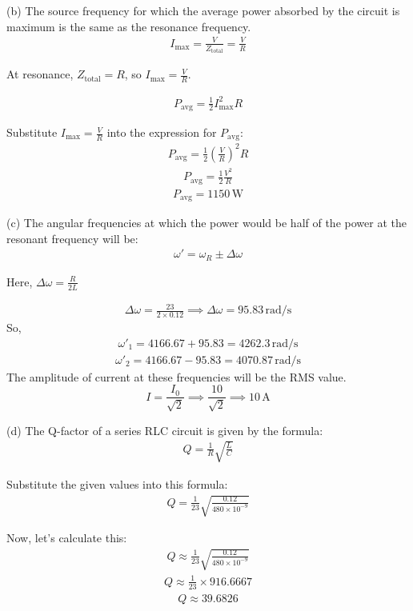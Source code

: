 \documentclass[journal,12pt,twocolumn]{IEEEtran}
\theoremstyle{remark}
\begin{document}
(b) The source frequency for which the average power absorbed by the circuit is maximum is the same as the resonance frequency. 
\begin{align}
    I_{\text{max}} = \frac{V}{Z_{\text{total}}} = \frac{V}{R}
\end{align}

At resonance, \(Z_{\text{total}} = R\), so \(I_{\text{max}} = \frac{V}{R}\).

\begin{align}
    P_{\text{avg}} = \frac{1}{2} I_{\text{max}}^2 R
\end{align}

Substitute \(I_{\text{max}} = \frac{V}{R}\) into the expression for \(P_{\text{avg}}\):
\begin{align}
    P_{\text{avg}} = \frac{1}{2} \left(\frac{V}{R}\right)^2 R
\end{align}
\begin{align}
    P_{\text{avg}} = \frac{1}{2} \frac{V^2}{R}
\end{align}
\begin{align}
    P_{\text{avg}} = 1150 \, \text{W}
\end{align}

(c) The angular frequencies at which the power would be half of the power at the resonant frequency will be:
\begin{align}
    \omega' = \omega_R \pm \Delta\omega 
\end{align}

Here, \( \Delta\omega = \frac{R}{2L} \)

\begin{align}
    \Delta\omega = \frac{23}{2 \times 0.12} \implies \Delta\omega = 95.83 \, \text{rad/s}
\end{align}
So,
\begin{align}
    \omega'_1 = 4166.67 + 95.83 = 4262.3 \, \text{rad/s} 
\end{align}
\begin{align}
    \omega'_2 = 4166.67 - 95.83 = 4070.87 \, \text{rad/s} 
\end{align}
The amplitude of current at these frequencies will be the RMS value.
\[
    I = \frac{I_0}{\sqrt{2}} \implies \frac{10}{\sqrt{2}} \implies 10 \, \text{A}
\]

(d) The Q-factor of a series RLC circuit is given by the formula:
\begin{align}
    Q = \frac{1}{R} \sqrt{\frac{L}{C}} 
\end{align}

Substitute the given values into this formula:
\begin{align}
    Q = \frac{1}{23} \sqrt{\frac{0.12}{480 \times 10^{-9}}} 
\end{align}

Now, let's calculate this:
\begin{align}
    Q \approx \frac{1}{23} \sqrt{\frac{0.12}{480 \times 10^{-9}}} 
\end{align}
\begin{align}
    Q \approx \frac{1}{23} \times 916.6667 
\end{align}
\begin{align}
    Q \approx 39.6826 
\end{align}
\end{document}

